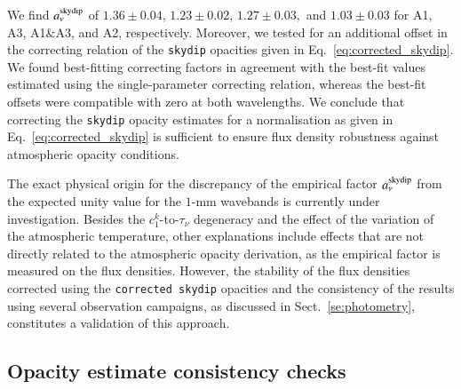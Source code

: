\documentclass[traditionalabstract]{aa}
\newcommand{\taunu}{\tau_{\nu}}
\newcommand{\lp}[1]{#1}
\newcommand{\rev}[1]{#1}
\begin{document}
{We find $a_\nu^{\rm{skydip}}$ of
$1.36 \pm 0.04$,
$1.23 \pm 0.02$,
$1.27 \pm 0.03,$ and
$1.03 \pm 0.03$ for A1, A3, A1$\&$A3, and A2, respectively.
Moreover, we tested for an additional offset in the
correcting relation of the {\tt skydip} opacities given in
Eq.~\ref{eq:corrected_skydip}. We found best-fitting correcting factors
in agreement with the best-fit values estimated using the single-parameter
correcting relation, whereas the best-fit offsets were compatible with
zero at both wavelengths. We conclude that correcting the {\tt skydip}
opacity estimates for a normalisation as given in
Eq.~\ref{eq:corrected_skydip} is sufficient to ensure flux density
robustness against atmospheric opacity conditions.

The exact physical origin for the discrepancy of the empirical factor
$a_\nu^{\rm{skydip}}$ from the expected unity value {\lp for the
$1$-mm wavebands} is currently under investigation.
{\rev Besides the $c_1^k$-to-$\taunu$ degeneracy and the effect
of the variation of the atmospheric temperature, other explanations
include effects that are not directly related to the atmospheric
opacity derivation, as the empirical factor is measured on the flux
densities.} 
However, the stability of the flux densities corrected using the
{\tt corrected skydip} opacities {\lp and the consistency of the results using
several observation campaigns}, as discussed in
Sect.~\ref{se:photometry}, constitutes a validation of this approach.


\subsection{Opacity estimate consistency checks}
\label{se:opacity_tests}

}
\end{document}
